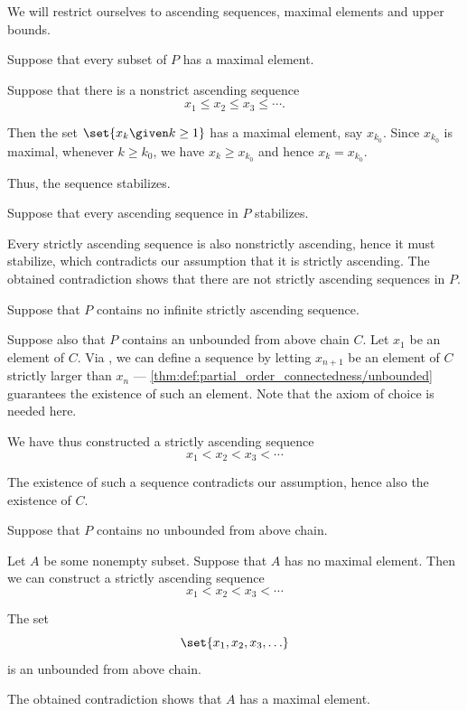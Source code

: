\begin{defproof}
  We will restrict ourselves to ascending sequences, maximal elements and upper bounds.

   Suppose that every subset of \( P \) has a maximal element.

  Suppose that there is a nonstrict ascending sequence
  \begin{equation*}
    x_1 \leq x_2 \leq x_3 \leq \cdots.
  \end{equation*}

  Then the set \( \set{ x_k \given k \geq 1 } \) has a maximal element, say \( x_{k_0} \). Since \( x_{k_0} \) is maximal, whenever \( k \geq k_0 \), we have \( x_k \geq x_{k_0} \) and hence \( x_k = x_{k_0} \).

  Thus, the sequence stabilizes.

   Suppose that every ascending sequence in \( P \) stabilizes.

  Every strictly ascending sequence is also nonstrictly ascending, hence it must stabilize, which contradicts our assumption that it is strictly ascending. The obtained contradiction shows that there are not strictly ascending sequences in \( P \).

   Suppose that \( P \) contains no infinite strictly ascending sequence.

  Suppose also that \( P \) contains an unbounded from above chain \( C \). Let \( x_1 \) be an element of \( C \). Via , we can define a sequence by letting \( x_{n+1} \) be an element of \( C \) strictly larger than \( x_n \) --- \cref{thm:def:partial_order_connectedness/unbounded} guarantees the existence of such an element. Note that the axiom of choice is needed here.

  We have thus constructed a strictly ascending sequence
  \begin{equation*}
    x_1 < x_2 < x_3 < \cdots
  \end{equation*}

  The existence of such a sequence contradicts our assumption, hence also the existence of \( C \).

   Suppose that \( P \) contains no unbounded from above chain.

  Let \( A \) be some nonempty subset. Suppose that \( A \) has no maximal element. Then we can construct a strictly ascending sequence
  \begin{equation*}
    x_1 < x_2 < x_3 < \cdots
  \end{equation*}

  The set
  \begin{equation*}
    \set{ x_1, x_2, x_3, \ldots }
  \end{equation*}
  is an unbounded from above chain.

  The obtained contradiction shows that \( A \) has a maximal element.
\end{defproof}

